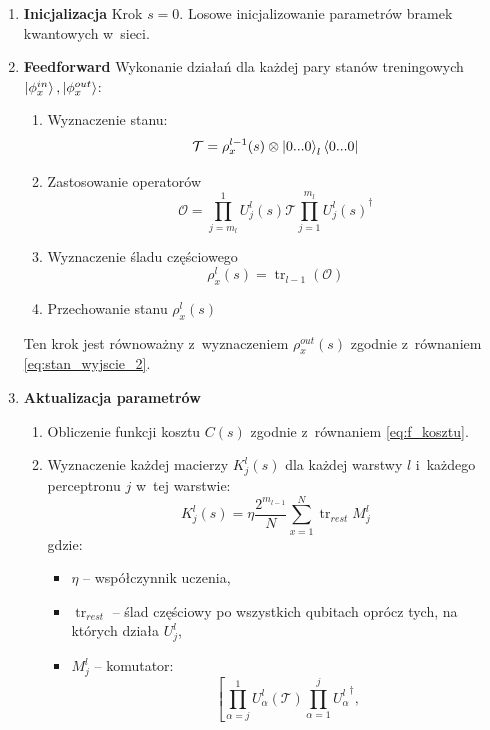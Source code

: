 \begin{tcolorbox}[title=Algorytm trenowania głębokiej sieci kwantowej,
    colback=blue!5!white,colframe=blue!75!black,
    breakable]
    
    \begin{enumerate}
        \item \textbf{Inicjalizacja} 
        Krok $s=0$. Losowe inicjalizowanie parametrów bramek kwantowych w~sieci.
        \item \textbf{Feedforward} 
        Wykonanie działań dla każdej pary stanów treningowych $\ket{\phi_x^{in}},\ket{\phi_x^{out}}$:
        \begin{enumerate}
            \item Wyznaczenie stanu: 
            \[\mathcal{T} = \rho_x^{l-1}(s)\otimes \ket{0...0}_l\bra{0...0} \]
            \item Zastosowanie operatorów 
            \[\mathcal{O} = \prod_{j=m_l}^{1}U_j^l(s)\mathcal{T}\prod_{j=1}^{m_l}{U_j^l(s)}^{\dagger} \]
            \item Wyznaczenie śladu częściowego \[\rho_x^l(s) = \operatorname{tr}_{l-1}(\mathcal{O}) \]
            \item Przechowanie stanu $\rho_x^l(s)$ 
        \end{enumerate}
        Ten krok jest równoważny z~wyznaczeniem $\rho_x^{out}(s)$ zgodnie z~równaniem \ref{eq:stan_wyjscie_2}.
        \item \textbf{Aktualizacja parametrów}
        \begin{enumerate}
            \item Obliczenie funkcji kosztu $C(s)$ zgodnie z~równaniem \ref{eq:f_kosztu}.
            \item Wyznaczenie każdej macierzy $K_j^l(s)$ dla każdej warstwy $l$ i~każdego perceptronu $j$ w~tej warstwie:
            \begin{equation}
                K_j^l(s)=\eta \frac{2^{m_{l-1}}}{N}\sum_{x=1}^{N}\operatorname{tr}_{rest}M_j^l
            \end{equation}
            gdzie:
            \begin{itemize}
                \item $\eta$ -- współczynnik uczenia,
                \item $\operatorname{tr}_{rest}$ -- ślad częściowy po wszystkich qubitach oprócz tych, na których działa $U_j^l$,
                \item $M_j^l$ -- komutator:
                \[\left[\prod_{\alpha=j}^{1}U_{\alpha}^l(\mathcal{T})\prod_{\alpha=1}^{j}{U_{\alpha}^l}^{\dagger},
\]
\end{itemize}
\end{enumerate}
\end{enumerate}
\end{tcolorbox}

